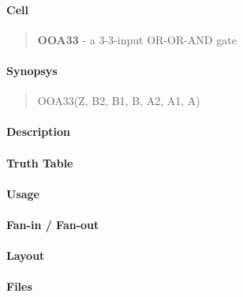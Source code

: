 \label{OOA33}
\paragraph{Cell}
\begin{quote}
    \textbf{OOA33} - a 3-3-input OR-OR-AND gate
\end{quote}

\paragraph{Synopsys}
\begin{quote}
    OOA33(Z, B2, B1, B, A2, A1, A)
\end{quote}

\paragraph{Description}

%

\paragraph{Truth Table}
%

\paragraph{Usage}

\paragraph{Fan-in / Fan-out}

\paragraph{Layout}

\paragraph{Files}
